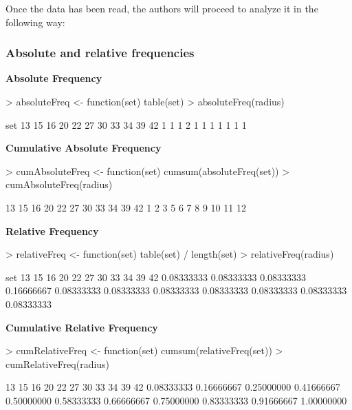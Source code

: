 \documentclass[a4paper]{article}
\begin{document}
Once the data has been read, the authors will proceed to analyze it in the
following way:


\subsubsection*{Absolute and relative frequencies}


\textbf{Absolute Frequency}

\begin{Schunk}
\begin{Sinput}
> absoluteFreq <- function(set) {table(set)}
> absoluteFreq(radius)
\end{Sinput}
\begin{Soutput}
set
13 15 16 20 22 27 30 33 34 39 42 
 1  1  1  2  1  1  1  1  1  1  1 
\end{Soutput}
\end{Schunk}



\textbf{Cumulative Absolute Frequency}

\begin{Schunk}
\begin{Sinput}
> cumAbsoluteFreq <- function(set) {cumsum(absoluteFreq(set))}
> cumAbsoluteFreq(radius)
\end{Sinput}
\begin{Soutput}
13 15 16 20 22 27 30 33 34 39 42 
 1  2  3  5  6  7  8  9 10 11 12 
\end{Soutput}
\end{Schunk}


\textbf{Relative Frequency}

\begin{Schunk}
\begin{Sinput}
> relativeFreq <- function(set) {table(set) / length(set)}
> relativeFreq(radius)
\end{Sinput}
\begin{Soutput}
set
        13         15         16         20         22         27         30         33         34         39         42 
0.08333333 0.08333333 0.08333333 0.16666667 0.08333333 0.08333333 0.08333333 0.08333333 0.08333333 0.08333333 0.08333333 
\end{Soutput}
\end{Schunk}


\textbf{Cumulative Relative Frequency}
\begin{Schunk}
\begin{Sinput}
> cumRelativeFreq <- function(set) {cumsum(relativeFreq(set))}
> cumRelativeFreq(radius)
\end{Sinput}
\begin{Soutput}
        13         15         16         20         22         27         30         33         34         39         42 
0.08333333 0.16666667 0.25000000 0.41666667 0.50000000 0.58333333 0.66666667 0.75000000 0.83333333 0.91666667 1.00000000 
\end{Soutput}
\end{Schunk}
\end{document}
